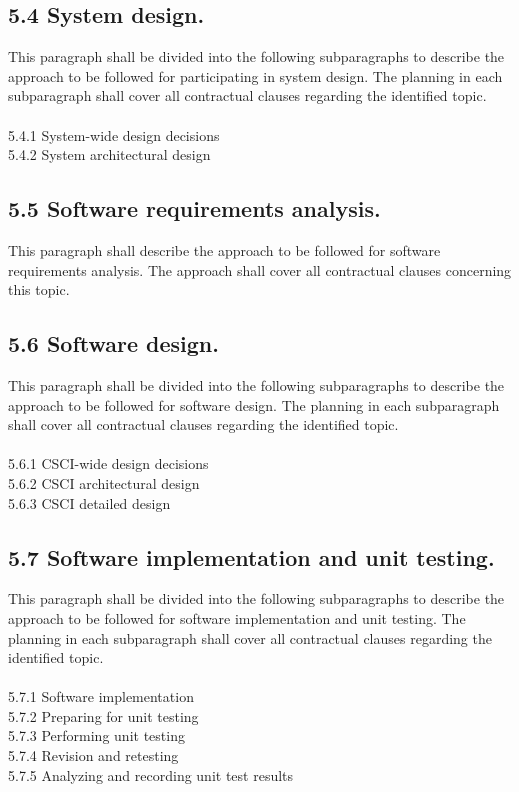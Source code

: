 \subsection{5.4 System design.}

This paragraph shall be divided into the following subparagraphs to
describe the approach to be followed for participating in system design.
The planning in each subparagraph shall cover all contractual clauses
regarding the identified topic. \\\\ 5.4.1 System-wide design decisions
\\ 5.4.2 System architectural design

\subsection{5.5 Software requirements analysis.}

This paragraph shall describe the approach to be followed for software
requirements analysis. The approach shall cover all contractual clauses
concerning this topic.

\subsection{5.6 Software design.}

This paragraph shall be divided into the following subparagraphs to
describe the approach to be followed for software design. The planning
in each subparagraph shall cover all contractual clauses regarding the
identified topic. \\\\ 5.6.1 CSCI-wide design decisions \\ 5.6.2 CSCI
architectural design \\ 5.6.3 CSCI detailed design

\subsection{5.7 Software implementation and unit testing.}

This paragraph shall be divided into the following subparagraphs to
describe the approach to be followed for software implementation and
unit testing. The planning in each subparagraph shall cover all
contractual clauses regarding the identified topic. \\\\ 5.7.1 Software
implementation \\ 5.7.2 Preparing for unit testing \\ 5.7.3 Performing
unit testing \\ 5.7.4 Revision and retesting \\ 5.7.5 Analyzing and
recording unit test results

